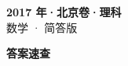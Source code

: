 \documentclass[zihao=-4, a4paper]{ctexart}
\begin{document}
\begin{center}
  {\Large\bfseries 2017 年·北京卷·理科}\\[4pt]
  {\large 数学 · 简答版}
\end{center}
\medskip
{}

\clearpage
{}
\begin{center}{\Large\bfseries 答案速查}\end{center}
\medskip

\end{document}
